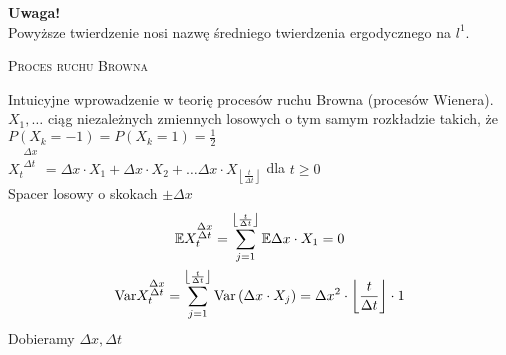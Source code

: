 \textbf{Uwaga!}\\
Powyższe twierdzenie nosi nazwę średniego twierdzenia ergodycznego na $ l^1 $.
\newpage
\begin{center}
{\Large\textsc{Proces ruchu Browna}}
\end{center}
Intuicyjne wprowadzenie w teorię procesów ruchu Browna (procesów Wienera).\\
$ X_1,\dots  $ ciąg niezależnych zmiennych losowych o tym samym rozkładzie takich, że 
$ P\left(X_k=-1\right)=P\left(X_k=1\right)=\frac{1}{2} $\\
$ X_t^{\substack{\Delta x\\\Delta t}} =\Delta x\cdot X_1+\Delta x\cdot X_2+\dots\Delta x\cdot X_{\left \lfloor\frac{t}{\Delta t}\right \rfloor}$ dla $ t\ge 0 $\\
Spacer losowy o skokach $ \pm\Delta x $\\
\begin{gather*}
\mathbb E X_t^{\substack{\Delta x\\\Delta t}}=\sum_{j=1}^{\left \lfloor\frac{t}{\Delta t}\right \rfloor}\mathbb E \Delta x\cdot X_1=0\\
\text{Var} X_t^{\substack{\Delta x\\\Delta t}}=\sum_{j=1}^{\left \lfloor\frac{t}{\Delta t}\right \rfloor}\text{Var}\left(\Delta x\cdot X_j\right)=\Delta x^2\cdot \left \lfloor\frac{t}{\Delta t}\right \rfloor\cdot 1
\end{gather*}
Dobieramy $ \Delta x,\Delta t $